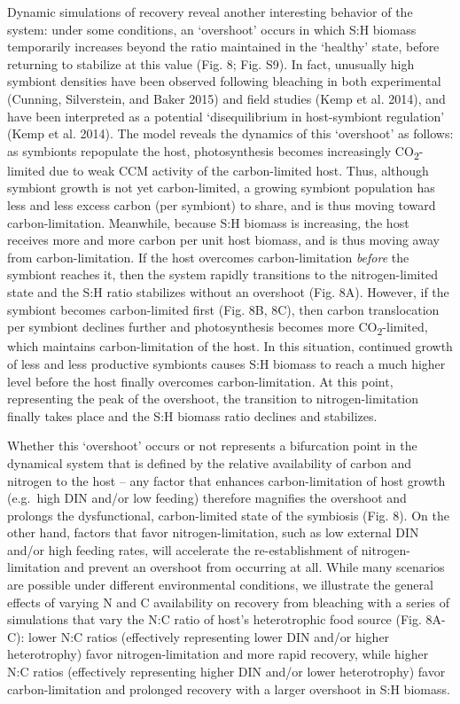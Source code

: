 \documentclass[]{elsarticle} %
\begin{document}
Dynamic simulations of recovery reveal another interesting behavior of
the system: under some conditions, an `overshoot' occurs in which S:H
biomass temporarily increases beyond the ratio maintained in the
`healthy' state, before returning to stabilize at this value (Fig. 8;
Fig. S9). In fact, unusually high symbiont densities have been observed
following bleaching in both experimental (Cunning, Silverstein, and
Baker 2015) and field studies (Kemp et al. 2014), and have been
interpreted as a potential `disequilibrium in host-symbiont regulation'
(Kemp et al. 2014). The model reveals the dynamics of this `overshoot'
as follows: as symbionts repopulate the host, photosynthesis becomes
increasingly CO\textsubscript{2}-limited due to weak CCM activity of the
carbon-limited host. Thus, although symbiont growth is not yet
carbon-limited, a growing symbiont population has less and less excess
carbon (per symbiont) to share, and is thus moving toward
carbon-limitation. Meanwhile, because S:H biomass is increasing, the
host receives more and more carbon per unit host biomass, and is thus
moving away from carbon-limitation. If the host overcomes
carbon-limitation \emph{before} the symbiont reaches it, then the system
rapidly transitions to the nitrogen-limited state and the S:H ratio
stabilizes without an overshoot (Fig. 8A). However, if the symbiont
becomes carbon-limited first (Fig. 8B, 8C), then carbon translocation
per symbiont declines further and photosynthesis becomes more
CO\textsubscript{2}-limited, which maintains carbon-limitation of the
host. In this situation, continued growth of less and less productive
symbionts causes S:H biomass to reach a much higher level before the
host finally overcomes carbon-limitation. At this point, representing
the peak of the overshoot, the transition to nitrogen-limitation finally
takes place and the S:H biomass ratio declines and stabilizes.

Whether this `overshoot' occurs or not represents a bifurcation point in
the dynamical system that is defined by the relative availability of
carbon and nitrogen to the host -- any factor that enhances
carbon-limitation of host growth (e.g.~high DIN and/or low feeding)
therefore magnifies the overshoot and prolongs the dysfunctional,
carbon-limited state of the symbiosis (Fig. 8). On the other hand,
factors that favor nitrogen-limitation, such as low external DIN and/or
high feeding rates, will accelerate the re-establishment of
nitrogen-limitation and prevent an overshoot from occurring at all.
While many scenarios are possible under different environmental
conditions, we illustrate the general effects of varying N and C
availability on recovery from bleaching with a series of simulations
that vary the N:C ratio of host's heterotrophic food source (Fig. 8A-C):
lower N:C ratios (effectively representing lower DIN and/or higher
heterotrophy) favor nitrogen-limitation and more rapid recovery, while
higher N:C ratios (effectively representing higher DIN and/or lower
heterotrophy) favor carbon-limitation and prolonged recovery with a
larger overshoot in S:H biomass.
\end{document}
